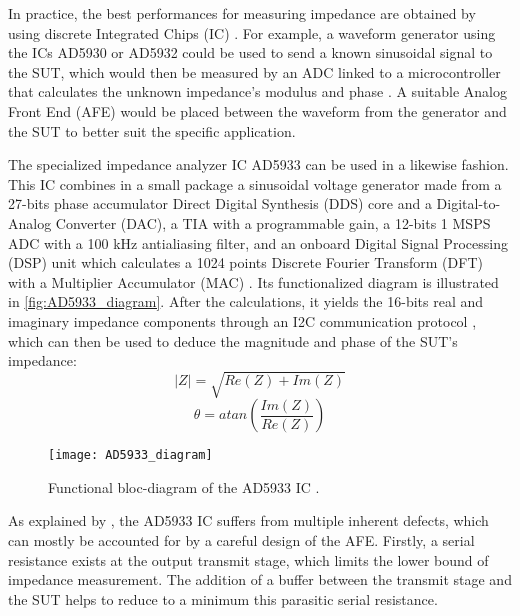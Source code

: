 In practice, the best performances for measuring impedance are obtained by using discrete Integrated Chips (IC) \cite{horowitz1989art}. For example, a waveform generator using the ICs AD5930 or AD5932 could be used to send a known sinusoidal signal to the SUT, which would then be measured by an ADC linked to a microcontroller that calculates the unknown impedance’s modulus and phase \cite{grossi2019electrical,Chowdhury2017}. A suitable Analog Front End (AFE) would be placed between the waveform from the generator and the SUT to better suit the specific application. \par

The specialized impedance analyzer IC AD5933 \cite{AD5933-documentation} can be used in a likewise fashion. This IC combines in a small package a sinusoidal voltage generator made from a 27-bits phase accumulator Direct Digital Synthesis (DDS) core and a Digital-to-Analog Converter (DAC), a TIA with a programmable gain, a 12-bits 1 MSPS ADC with a 100 kHz antialiasing filter, and an onboard Digital Signal Processing (DSP) unit which calculates a 1024 points Discrete Fourier Transform (DFT) with a Multiplier Accumulator (MAC) \cite{horowitz1989art}. Its functionalized diagram is illustrated in \autoref{fig:AD5933_diagram}. After the calculations, it yields the 16-bits real and imaginary impedance components through an I2C communication protocol \cite{horowitz1989art}, which can then be used to deduce the magnitude and phase of the SUT’s impedance:
\begin{equation}
   \lvert Z \rvert = \sqrt{Re(Z)+Im(Z)}
\end{equation}
\begin{equation}
   \theta = atan(\frac{Im(Z)}{Re(Z)})
\end{equation}
\begin{figure}[h]
    \centering
    \texttt{[image: AD5933\_diagram]}
    \caption{Functional bloc-diagram of the AD5933 IC \cite{AD5933-documentation}.}
    \label{fig:AD5933_diagram}
\end{figure}
As explained by \citep{Chabowski2015}, the AD5933 IC suffers from multiple inherent defects, which can mostly be accounted for by a careful design of the AFE. Firstly, a serial resistance exists at the output transmit stage, which limits the lower bound of impedance measurement. The addition of a buffer between the transmit stage and the SUT helps to reduce to a minimum this parasitic serial resistance. \par

